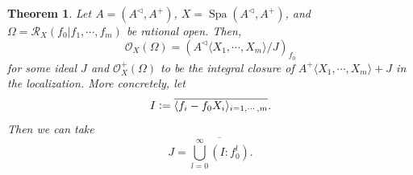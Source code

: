 \documentclass[8pt]{article}
\numberwithin{equation}{section}
\newtheorem{theorem}{Theorem} [subsection]
\DeclareMathOperator{\Spa}{Spa}
\newcommand{\defeq}{\vcentcolon=}
\newcommand{\cR}[0]{\mathcal{R}}
\newcommand{\cO}[0]{\mathcal{O}}
\newcommand{\comppol}[1]{\langle X_1,\cdots, X_{#1}\rangle}
\begin{document}
\begin{theorem}
    \label{theorem_20_3_3}
    \label{theorem_20_3_c}
    Let $A=(A^\triangleleft,A^+)$, $X=\Spa(A^\triangleleft,A^+)$, and $\Omega = \cR_X(f_0|f_1,\cdots,f_m)$ be rational open. Then,
    \begin{equation*}
        \cO_X(\Omega) = (A^\triangleleft\comppol{m}/J)_{f_0}
    \end{equation*}
    for some ideal $J$ and $\cO^+_X(\Omega)$ to be the integral closure of $A^+\comppol{m}+J$ in the localization. More concretely, let 
    \begin{equation*}
        I \defeq \overline{\langle f_i-f_0X_i\rangle_{i=1,\cdots,m}}.
    \end{equation*}
    Then we can take
    \begin{equation*}
        J =\overline{\bigcup_{l=0}^\infty(I:f_0^l)}.
    \end{equation*}
\end{theorem}
\end{document}

